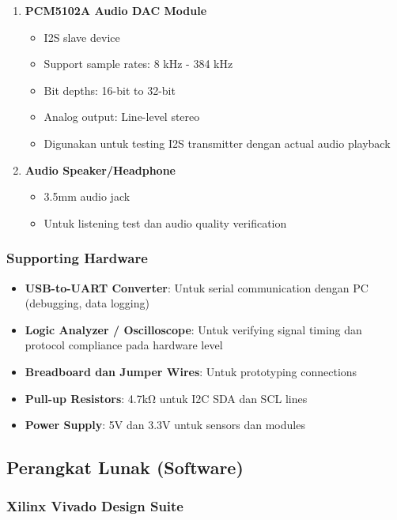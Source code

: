 \begin{enumerate}
	\item \textbf{PCM5102A Audio DAC Module}
	\begin{itemize}
		\item I2S slave device
		\item Support sample rates: 8 kHz - 384 kHz
		\item Bit depths: 16-bit to 32-bit
		\item Analog output: Line-level stereo
		\item Digunakan untuk testing I2S transmitter dengan actual audio playback
	\end{itemize}
	
	\item \textbf{Audio Speaker/Headphone}
	\begin{itemize}
		\item 3.5mm audio jack
		\item Untuk listening test dan audio quality verification
	\end{itemize}
\end{enumerate}

\subsubsection{Supporting Hardware}

\begin{itemize}
	\item \textbf{USB-to-UART Converter}: Untuk serial communication dengan PC (debugging, data logging)
	\item \textbf{Logic Analyzer / Oscilloscope}: Untuk verifying signal timing dan protocol compliance pada hardware level
	\item \textbf{Breadboard dan Jumper Wires}: Untuk prototyping connections
	\item \textbf{Pull-up Resistors}: 4.7kΩ untuk I2C SDA dan SCL lines
	\item \textbf{Power Supply}: 5V dan 3.3V untuk sensors dan modules
\end{itemize}

\subsection{Perangkat Lunak (Software)}

\subsubsection{Xilinx Vivado Design Suite}

